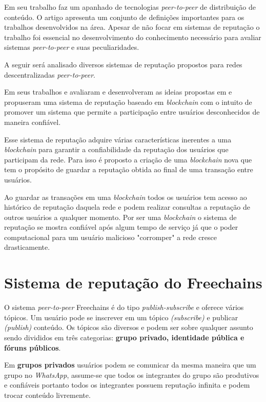 \documentclass[12pt]{article}
\newcommand{\FC} {Freechains\xspace}
\newcommand{\PtoP} {\emph{peer-to-peer}\xspace}
\begin{document}
Em seu trabalho \cite{10.1145/1041680.1041681} faz um apanhado de tecnologias \PtoP de distribuição de conteúdo. O artigo apresenta um conjunto de definições importantes para os trabalhos desenvolvidos na área. Apesar de não focar em sistemas de reputação o trabalho foi essencial no desenvolvimento do conhecimento necessário para avaliar sistemas \PtoP e suas peculiaridades.

A seguir será analisado diversos sistemas de reputação propostos para redes descentralizadas \PtoP.

Em seus trabalhos \cite{dennis2015rep} e \cite{dennis2016rep} avaliaram e desenvolveram as ideias propostas em \cite{nakamoto2008peer} e propuseram uma sistema de reputação baseado em \emph{blockchain} com o intuito de promover um sistema que permite a participação entre usuários desconhecidos de maneira confiável. 

Esse sistema de reputação adquire várias características inerentes a uma \emph{blockchain} para garantir a confiabilidade da reputação dos usuários que participam da rede. Para isso é proposto a criação de uma \emph{blockchain} nova que tem o propósito de guardar a reputação obtida ao final de uma transação entre usuários.

Ao guardar as transações em uma \emph{blockchain} todos os usuários tem acesso ao histórico de reputação daquela rede e podem realizar consultas a reputação de outros usuários a qualquer momento. Por ser uma \emph{blockchain} o sistema de reputação se mostra confiável após algum tempo de serviço já que o poder computacional para um usuário malicioso "corromper" a rede cresce drasticamente.

\cite{ekanayake2014decentralized}

\section{Sistema de reputação do \FC} \label{sec:freechains}

O sistema \PtoP \FC é do tipo \emph{publish-subscribe} e oferece vários tópicos. Um usuário pode se inscrever em um tópico \emph{(subscribe)} e publicar \emph{(publish)} conteúdo. Os tópicos são diversos e podem ser sobre qualquer assunto sendo divididos 
em três categorias: \textbf{grupo privado, identidade pública e fóruns públicos}. 

Em \textbf{grupos privados} usuários podem se comunicar da mesma maneira que um grupo no \emph{WhatsApp}, assume-se que todos os integrantes do grupo são produtivos e confiáveis portanto todos os integrantes possuem reputação infinita e podem trocar conteúdo livremente.
\end{document}
